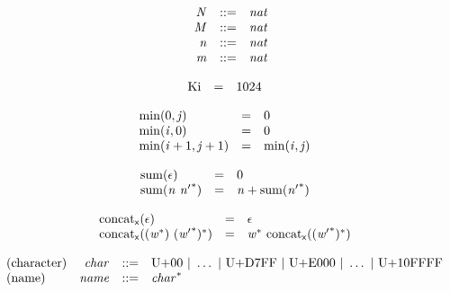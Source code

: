 \vspace{1ex}

$$
\begin{array}{@{}lrrl@{}l@{}}
& {\mathit{N}} &::=& {\mathit{nat}} \\
& {\mathit{M}} &::=& {\mathit{nat}} \\
& {\mathit{n}} &::=& {\mathit{nat}} \\
& {\mathit{m}} &::=& {\mathit{nat}} \\
\end{array}
$$

\vspace{1ex}

$$
\begin{array}{@{}lcl@{}l@{}}
{\mathrm{Ki}} &=& 1024 &  \\
\end{array}
$$

\vspace{1ex}

$$
\begin{array}{@{}lcl@{}l@{}}
{\mathrm{min}}(0, {\mathit{j}}) &=& 0 &  \\
{\mathrm{min}}({\mathit{i}}, 0) &=& 0 &  \\
{\mathrm{min}}({\mathit{i}} + 1, {\mathit{j}} + 1) &=& {\mathrm{min}}({\mathit{i}}, {\mathit{j}}) &  \\
\end{array}
$$

$$
\begin{array}{@{}lcl@{}l@{}}
{\mathrm{sum}}(\epsilon) &=& 0 &  \\
{\mathrm{sum}}({\mathit{n}}~{{\mathit{n}'}^\ast}) &=& {\mathit{n}} + {\mathrm{sum}}({{\mathit{n}'}^\ast}) &  \\
\end{array}
$$

\vspace{1ex}

$$
\begin{array}{@{}lcl@{}l@{}}
{{\mathrm{concat}}}_{{\mathsf{x}}}(\epsilon) &=& \epsilon &  \\
{{\mathrm{concat}}}_{{\mathsf{x}}}(({{\mathit{w}}^\ast})~{({{\mathit{w}'}^\ast})^\ast}) &=& {{\mathit{w}}^\ast}~{{\mathrm{concat}}}_{{\mathsf{x}}}({({{\mathit{w}'}^\ast})^\ast}) &  \\
\end{array}
$$

$$
\begin{array}{@{}lrrl@{}l@{}}
\mbox{(character)} & {\mathit{char}} &::=& \mathrm{U{+}00} ~|~ \dots ~|~ \mathrm{U{+}D7FF} ~|~ \mathrm{U{+}E000} ~|~ \dots ~|~ \mathrm{U{+}10FFFF} \\
\mbox{(name)} & {\mathit{name}} &::=& {{\mathit{char}}^\ast} \\
\end{array}
$$

